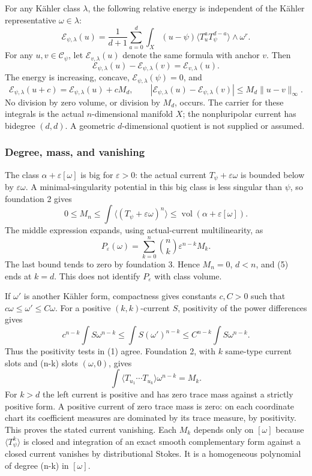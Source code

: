 \documentclass[
  11pt,
]{article}
\begin{document}
For any Kähler class \(\lambda\), the following relative energy is
independent of the Kähler representative \(\omega\in\lambda\): \[
\mathcal{E}_{\psi,\lambda}(u)
=\frac1{d+1}\sum_{a=0}^d\int_X(u-\psi)
\langle T_u^aT_\psi^{d-a}\rangle\wedge\omega^r.
\tag{2}
\] For any \(u,v\in\mathcal{C}_\psi\), let \(\mathcal{E}_{v,\lambda}(u)\)
denote the same formula with anchor \(v\). Then \[
\mathcal{E}_{\psi,\lambda}(u)-\mathcal{E}_{\psi,\lambda}(v)
=\mathcal{E}_{v,\lambda}(u).
\tag{3}
\] The energy is increasing, concave,
\(\mathcal{E}_{\psi,\lambda}(\psi)=0\), and \[
\mathcal{E}_{\psi,\lambda}(u+c)=\mathcal{E}_{\psi,\lambda}(u)+cM_d,
\qquad
|\mathcal{E}_{\psi,\lambda}(u)-\mathcal{E}_{\psi,\lambda}(v)|
\leq M_d\|u-v\|_\infty.
\tag{4}
\] No division by zero volume, or division by \(M_d\), occurs. The
carrier for these integrals is the actual \(n\)-dimensional manifold
\(X\); the nonpluripolar current has bidegree \((d,d)\). A geometric
\(d\)-dimensional quotient is not supplied or assumed.

\subsubsection{Degree, mass, and
vanishing}\label{degree-mass-and-vanishing}

The class \(\alpha+\varepsilon[\omega]\) is big for \(\varepsilon>0\):
the actual current \(T_\psi+\varepsilon\omega\) is bounded below by
\(\varepsilon\omega\). A minimal-singularity potential in this big class
is less singular than \(\psi\), so foundation 2 gives \[
0\leq M_n\leq\int\langle(T_\psi+\varepsilon\omega)^n\rangle
\leq\operatorname{vol}(\alpha+\varepsilon[\omega]).
\] The middle expression expands, using actual-current multilinearity,
as \[
P_\varepsilon(\omega)=\sum_{k=0}^n\binom nk\varepsilon^{n-k}M_k.
\tag{5}
\] The last bound tends to zero by foundation 3. Hence \(M_n=0\),
\(d<n\), and (5) ends at \(k=d\). This does not identify
\(P_\varepsilon\) with class volume.

If \(\omega'\) is another Kähler form, compactness gives constants
\(c,C>0\) such that \(c\omega\leq\omega'\leq C\omega\). For a positive
\((k,k)\)-current \(S\), positivity of the power differences gives \[
c^{n-k}\int S\omega^{n-k}\leq\int S(\omega')^{n-k}\leq C^{n-k}\int S\omega^{n-k}.
\] Thus the positivity tests in (1) agree. Foundation 2, with \(k\)
same-type current slots and (n-k) slots \((\omega,0)\), gives \[
\int\langle T_{u_1}\cdots T_{u_k}\rangle\omega^{n-k}=M_k.
\tag{6}
\] For \(k>d\) the left current is positive and has zero trace mass
against a strictly positive form. A positive current of zero trace mass
is zero: on each coordinate chart its coefficient measures are dominated
by its trace measure, by positivity. This proves the stated current
vanishing. Each \(M_k\) depends only on \([\omega]\) because
\(\langle T_\psi^k\rangle\) is closed and integration of an exact smooth
complementary form against a closed current vanishes by distributional
Stokes. It is a homogeneous polynomial of degree (n-k) in \([\omega]\).
\end{document}
